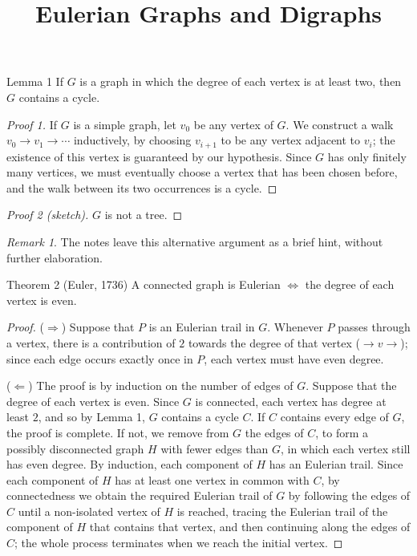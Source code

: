 \documentclass[11pt]{scrartcl}
\title{\color{accentblue}Eulerian Graphs and Digraphs}
\author{}
\date{}
\theoremstyle{plain}
\theoremstyle{remark}
\newtheorem*{remark}{Remark}
\begin{document}
\maketitle

\begin{thmbox}{Lemma 1}
If $G$ is a graph in which the degree of each vertex is at least two, then $G$ contains a cycle.
\end{thmbox}

\begin{proof}[Proof 1]
If $G$ is a simple graph, let $v_0$ be any vertex of $G$. We construct a walk $v_0 \to v_1 \to \cdots$ inductively, by choosing $v_{i+1}$ to be any vertex adjacent to $v_i$; the existence of this vertex is guaranteed by our hypothesis. Since $G$ has only finitely many vertices, we must eventually choose a vertex that has been chosen before, and the walk between its two occurrences is a cycle.
\end{proof}

\begin{proof}[Proof 2 (sketch)]
$G$ is not a tree.
\end{proof}

\begin{remark}
The notes leave this alternative argument as a brief hint, without further elaboration.
\end{remark}

\begin{thmbox}{{Theorem 2 (Euler, 1736)}}
A connected graph is Eulerian $\iff$ the degree of each vertex is even.
\end{thmbox}

\begin{proof}
($\Rightarrow$) Suppose that $P$ is an Eulerian trail in $G$. Whenever $P$ passes through a vertex, there is a contribution of $2$ towards the degree of that vertex ($\to v \to$); since each edge occurs exactly once in $P$, each vertex must have even degree.

\medskip
\noindent ($\Leftarrow$) The proof is by induction on the number of edges of $G$. Suppose that the degree of each vertex is even. Since $G$ is connected, each vertex has degree at least $2$, and so by Lemma 1, $G$ contains a cycle $C$. If $C$ contains every edge of $G$, the proof is complete. If not, we remove from $G$ the edges of $C$, to form a possibly disconnected graph $H$ with fewer edges than $G$, in which each vertex still has even degree. By induction, each component of $H$ has an Eulerian trail. Since each component of $H$ has at least one vertex in common with $C$, by connectedness we obtain the required Eulerian trail of $G$ by following the edges of $C$ until a non-isolated vertex of $H$ is reached, tracing the Eulerian trail of the component of $H$ that contains that vertex, and then continuing along the edges of $C$; the whole process terminates when we reach the initial vertex.
\end{proof}
\end{document}
